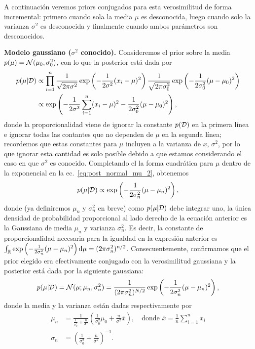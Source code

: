 A continuación veremos priors conjugados para esta verosimilitud de forma incremental: primero cuando sola la media $\mu$ es desconocida, luego cuando solo la varianza $\sigma^2$ es desconocida y finalmente cuando ambos parámetros son desconocidos.  

\textbf{Modelo gaussiano ($\sigma^2$ conocido).} Consideremos el prior sobre la media $p(\mu) = {\mathcal N}(\mu_0,\sigma_0^2)$, con lo que la posterior está dada por  
 \begin{align}
 	p(\mu|{\mathcal D}) &\propto \prod_{i=1}^n \frac{1}{\sqrt{2\pi\sigma^2}}\exp\left(-\frac{1}{2\sigma^2}(x_i-\mu)^2\right) \frac{1}{\sqrt{2\pi\sigma_0^2}}\exp\left(-\frac{1}{2\sigma_0^2}(\mu-\mu_0)^2\right)\label{eq:post_normal_mu_1}\\
 	&\propto \exp\left(-\frac{1}{2\sigma^2}\sum_{i=1}^n(x_i-\mu)^2-\frac{1}{2\sigma_0^2}(\mu-\mu_0)^2\right),\label{eq:post_normal_mu_2}
 \end{align} 
 donde la proporcionalidad viene de ignorar la constante $p({\mathcal D})$ en la primera línea e ignorar todas las contantes que no dependen de $\mu$ en la segunda línea; recordemos que estas constantes para $\mu$ incluyen a la varianza de $x$, $\sigma^2$, por lo que ignorar esta cantidad es solo posible debido a que estamos considerando el caso en que $\sigma^2$ es conocido. Completando el la forma cuadrática para $\mu$ dentro de la exponencial en la ec.~\eqref{eq:post_normal_mu_2}, obtenemos
 \begin{equation}
 	p(\mu|{\mathcal D}) \propto \exp\left(-\frac{1}{2\sigma_n^2}(\mu - \mu_n)^2\right),\label{eq:post_normal_mu_3}
 \end{equation} 
 donde (ya definiremos $\mu_n$ y $\sigma_n^2$ en breve) como $p(\mu|{\mathcal D})$ debe integrar uno, la única densidad de probabilidad proporcional al lado derecho de la ecuación anterior es la Gaussiana de media $\mu_n$ y varianza $\sigma_n^2$. Es decir, la constante de proporcionalidad necesaria para la igualdad en la expresión anterior es $\int_{\mathbb R}\exp\left(-\frac{1}{2\sigma_n^2}(\mu - \mu_n)^2\right){\text d}\mu = (2\pi\sigma_n^2)^{n/2}$. Consecuentemente, confirmamos que el prior elegido era efectivamente conjugado con la verosimilitud gaussiana y la posterior está dada por la siguiente gaussiana:
  \begin{equation}
 	p(\mu|{\mathcal D}) = {\mathcal N}(\mu;\mu_n,\sigma_n^2) = \frac{1}{(2\pi\sigma_n^2)^{N/2}}\exp\left(-\frac{1}{2\sigma_n^2}(\mu - \mu_n)^2\right),\label{eq:post_normal_mu_4}
 \end{equation} 
 donde la media y la varianza están dadas respectivamente  por 
 \begin{align}
 	\mu_n &= \frac{1}{\tfrac{1}{\sigma_0^2} + \tfrac{n}{\sigma^2}} \left(\frac{1}{\sigma_0^2}\mu_0 + \frac{n}{\sigma^2}\bar{x} \right), \quad \text{donde } \bar{x} = \frac{1}{n}\sum_{i=1}^n x_i\label{eq:post_Gm}\\
 	\sigma_n &= \left(\frac{1}{\sigma_0^2} + \frac{n}{\sigma^2}\right)^{-1}.\label{eq:post_Gv}
 \end{align}

